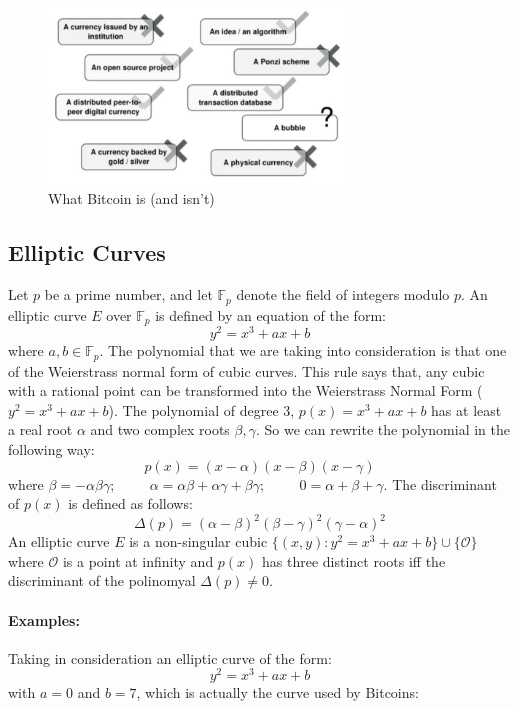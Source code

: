 \documentclass{article}
\begin{document}
\begin{figure}[H]
    \centering
    \includegraphics[width=8cm]{images/1.png}
    \caption{What Bitcoin is (and isn’t)}
\end{figure}

\subsection*{Elliptic Curves}
Let \(p\) be a prime number, and let \(\mathbb{F}_{p}\) denote the field of integers modulo \(p\). An elliptic curve \(E\) over \(\mathbb{F}_{p}\) is defined by an equation of the form:
\[ y^2 = x^3 + ax + b \]
where \(a, b \in \mathbb{F}_{p}\).\newline
The polynomial that we are taking into consideration is that one of the Weierstrass normal form of cubic curves. This rule says that, any cubic with a rational point can be transformed into the Weierstrass Normal Form (\( y^2 = x^3 + ax + b \)). The polynomial of degree 3, \( p(x) = x^3 + ax + b \) has at least a real root \(\alpha\) and two complex roots \(\beta, \gamma\). So we can rewrite the polynomial in the following way: \[p(x) = (x - \alpha)(x - \beta)(x - \gamma)\]\newline 
where \(\beta=-\alpha\beta\gamma;\hspace{1cm} \alpha=\alpha\beta+\alpha\gamma+\beta\gamma;\hspace{1cm} 0=\alpha+\beta+\gamma\).\vspace{5mm}\newline
The discriminant of \(p(x)\) is defined as follows:\newline
\[\Delta(p) = (\alpha - \beta)^2(\beta - \gamma)^2(\gamma - \alpha)^2\]\newline
An elliptic curve \(E\) is a non-singular cubic \(\{(x, y) : y^2 = x^3 + ax + b\} \cup \{\mathcal{O}\}\) where \(\mathcal{O}\) is a point at infinity and \(p(x)\) has three distinct roots iff the discriminant of the polinomyal \(\Delta(p) \neq 0\).
\paragraph{Examples:} Taking in consideration an elliptic curve of the form:
\[y^2 = x^3 + ax + b\]
with \(a = 0\) and \(b = 7\), which is actually the curve used by Bitcoins:
\end{document}

